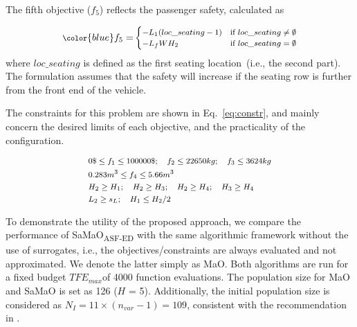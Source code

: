 The fifth objective ($f_5$) reflects the passenger safety, calculated as

\begin{equation}\footnotesize
{\color{blue}f_5=}\begin{cases}
-L_1(loc\_seating - 1) & \text{if}~loc\_seating \neq \emptyset\\
-L_fWH_2 & \text{if}~loc\_seating = \emptyset\\
\end{cases}
\label{eq:f5}
\end{equation}
where $loc\_seating$ is defined as the first seating location~{\color{blue}(i.e., the second part)}. The formulation assumes that the safety will increase if the seating row is further from the front end of the vehicle. 

The constraints for this problem are shown in Eq.~\ref{eq:constr}, and mainly concern the desired limits of each objective, and the practicality of the configuration. 

\begin{equation}\footnotesize
\begin{aligned}
& 0 \$ \le f_1 \le 100000 \$; \quad f_2 \le 22650 kg; \quad f_3 \le 3624 kg \\
& 0.283 m^3 \le f_4 \le 5.66 m^3 \\
& H_2 \ge H_1; \quad H_2 \ge H_3; \quad H_2 \ge H_4; \quad H_3 \ge H_4 \\ 
&L_2 \ge s_L; \quad H_1 \le H_2/2 \\
\end{aligned}
\label{eq:constr}
\end{equation}

To demonstrate the utility of the proposed approach, we compare the performance of SaMaO\textsubscript{ASF-ED} with the same algorithmic framework {\color{blue}without the use of surrogates, i.e., the objectives/constraints are always evaluated and not approximated. We denote the latter simply as MaO}. Both algorithms {\color{blue}are run for} a fixed budget $TFE_{max} $of 4000 function evaluations. The population size for MaO and SaMaO is set as 126 ($H$ = 5). {\color{blue}Additionally, the initial population size is considered as $N_I = 11 \times (n_{var} - 1) = 109$, consistent with the recommendation in \cite{KHTchugh2016krvea}}. 

